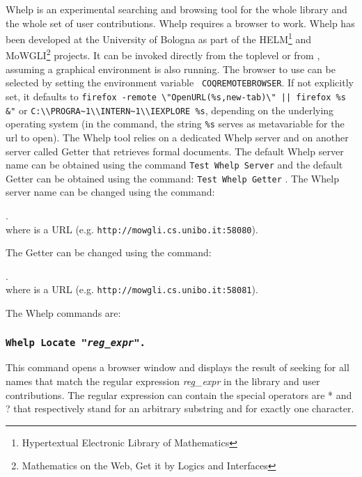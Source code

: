 {\sc Whelp} is an experimental searching and browsing tool for the
whole {\Coq} library and the whole set of {\Coq} user contributions.
{\sc Whelp} requires a browser to work. {\sc Whelp} has been developed
at the University of Bologna as part of the HELM\footnote{Hypertextual
Electronic Library of Mathematics} and MoWGLI\footnote{Mathematics on
the Web, Get it by Logics and Interfaces} projects.  It can be invoked
directly from the {\Coq} toplevel or from {\CoqIDE}, assuming a
graphical environment is also running. The browser to use can be
selected by setting the environment variable {\tt
COQREMOTEBROWSER}. If not explicitly set, it defaults to
\verb!firefox -remote \"OpenURL(%s,new-tab)\" || firefox %s &"!  or
\verb!C:\\PROGRA~1\\INTERN~1\\IEXPLORE %s!, depending on the
underlying operating system (in the command, the string \verb!%s!
serves as metavariable for the url to open).
The Whelp tool relies on a dedicated Whelp server and on another server
called Getter that retrieves formal documents. The default Whelp server name
can be obtained using the command {\tt Test Whelp Server}
 and the default Getter can be obtained
using the command: {\tt Test Whelp Getter} . The Whelp server name can be changed using the command:

\smallskip
{}.\\
where {\str} is a URL (e.g. {\tt http://mowgli.cs.unibo.it:58080}).
\smallskip

\noindent The Getter can be changed using the command:
\smallskip

.\\
where {\str} is a URL (e.g. {\tt http://mowgli.cs.unibo.it:58081}).  

\bigskip

The {\sc Whelp} commands are:

\subsubsection{\tt Whelp Locate "{\sl reg\_expr}".
}

This command opens a browser window and displays the result of seeking
for all names that match the regular expression {\sl reg\_expr} in the
{\Coq} library and user contributions. The regular expression can
contain the special operators are * and ? that respectively stand for
an arbitrary substring and for exactly one character.

